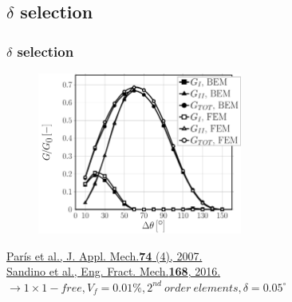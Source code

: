 \documentclass[first,firstsupp,lastsupp,last,hyperref,table]{ETHclass}
\begin{document}
%
%
%

\subsection{$\delta$ selection}

\begin{frame}
\frametitle{\vspace{0.25cm}\small $\delta$ selection}
\vspace{-.75cm}
\centering
\begin{figure}
\centering
\includegraphics[width=0.6\textwidth]{validation-VCCT.pdf}
\end{figure}
\vspace{-.5cm}
\centering
\pgfmathsetmacro{}
\pgfmathsetmacro{}
{\centering\fontsize{\fontsizeref}{\stretchref} \selectfont \href{https://doi.org/10.1115/1.2711220
}{Par\'is et al., J. Appl. Mech.\textbf{74} (4), 2007.}}\\\vspace{-5pt}
{\centering\fontsize{\fontsizeref}{\stretchref} \selectfont \href{https://doi.org/10.1016/j.engfracmech.2016.01.022
}{Sandino et al., Eng. Fract. Mech.\textbf{168}, 2016.}}\\\vspace{.1cm}
$\rightarrow 1\times1-free, V_{f}=0.01\%, 2^{nd}\ order\ elements,\delta=0.05^{\circ}$ 
\end{frame}
\end{document}
